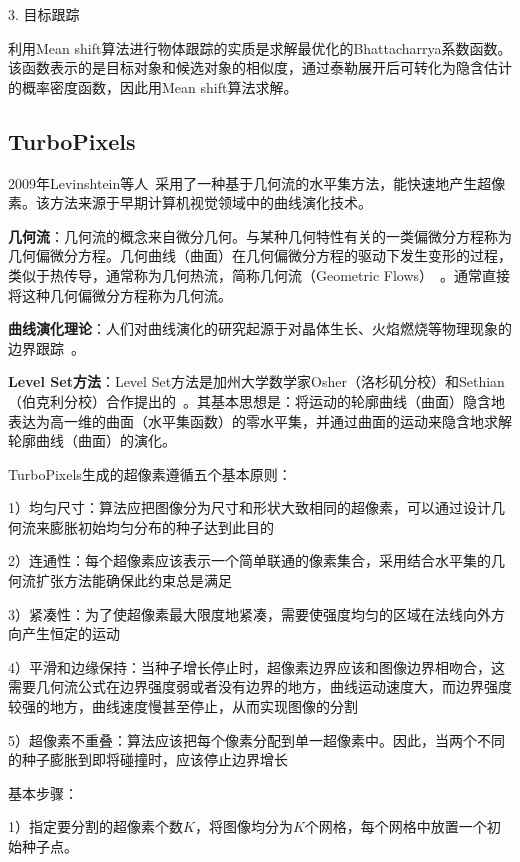 \documentclass[12pt]{article}
\begin{document}
3. 目标跟踪

利用Mean shift算法进行物体跟踪的实质是求解最优化的Bhattacharrya系数函数\cite{fashing2005mean}。该函数表示的是目标对象和候选对象的相似度，通过泰勒展开后可转化为隐含估计的概率密度函数，因此用Mean shift算法求解。

\subsection{TurboPixels}

2009年Levinshtein等人~\cite{levinshtein2009turbopixels}采用了一种基于几何流的水平集方法，能快速地产生超像素。该方法来源于早期计算机视觉领域中的曲线演化技术。

\textbf{几何流}：几何流的概念来自微分几何。与某种几何特性有关的一类偏微分方程称为几何偏微分方程。几何曲线（曲面）在几何偏微分方程的驱动下发生变形的过程，类似于热传导，通常称为几何热流，简称几何流（Geometric Flows）~\cite{sapiro2006geometric, bakas2005algebraic}。通常直接将这种几何偏微分方程称为几何流。

\textbf{曲线演化理论}：人们对曲线演化的研究起源于对晶体生长、火焰燃烧等物理现象的边界跟踪~\cite{sethian1985curvature}。

\textbf{Level Set方法}：Level Set方法是加州大学数学家Osher（洛杉矶分校）和Sethian（伯克利分校）合作提出的~\cite{osher1988fronts}。其基本思想是：将运动的轮廓曲线（曲面）隐含地表达为高一维的曲面（水平集函数）的零水平集，并通过曲面的运动来隐含地求解轮廓曲线（曲面）的演化。

TurboPixels生成的超像素遵循五个基本原则：

1）均匀尺寸：算法应把图像分为尺寸和形状大致相同的超像素，可以通过设计几何流来膨胀初始均匀分布的种子达到此目的

2）连通性：每个超像素应该表示一个简单联通的像素集合，采用结合水平集的几何流扩张方法能确保此约束总是满足

3）紧凑性：为了使超像素最大限度地紧凑，需要使强度均匀的区域在法线向外方向产生恒定的运动

4）平滑和边缘保持：当种子增长停止时，超像素边界应该和图像边界相吻合，这需要几何流公式在边界强度弱或者没有边界的地方，曲线运动速度大，而边界强度较强的地方，曲线速度慢甚至停止，从而实现图像的分割

5）超像素不重叠：算法应该把每个像素分配到单一超像素中。因此，当两个不同的种子膨胀到即将碰撞时，应该停止边界增长

基本步骤：

1）指定要分割的超像素个数$K$，将图像均分为$K$个网格，每个网格中放置一个初始种子点。
\end{document}

